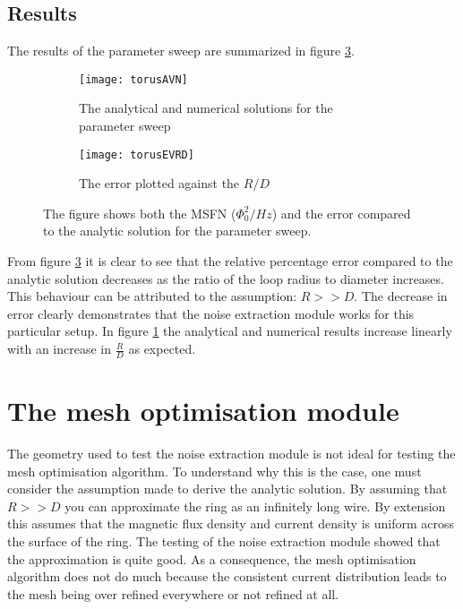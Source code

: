 \subsection{Results}

The results of the parameter sweep are summarized in figure \ref{fig:resTorus}.
\begin{figure}[H]
    \centering
    \begin{subfigure}[b]{0.48\textwidth}
        \centering
        \texttt{[image: torusAVN]}
        \caption{The analytical and numerical solutions for the parameter sweep}
        \label{fig:MSFNvRD}
    \end{subfigure}
    \hfill
    \begin{subfigure}[b]{0.48\textwidth}
        \centering
        \texttt{[image: torusEVRD]}
        \caption{The error plotted against the $R/D$}
        \label{fig:evRD}
    \end{subfigure}
    \caption{The figure shows both the MSFN ($\Phi_0^2 / Hz$) and the error compared to the analytic solution for the parameter sweep.}
    \label{fig:resTorus}
\end{figure}
From figure \ref{fig:resTorus} it is clear to see that the relative percentage error compared to the analytic solution decreases as the ratio of the loop radius to diameter increases. This behaviour can be attributed to the assumption: $R >> D$. The decrease in error clearly demonstrates that the noise extraction module works for this particular setup. In figure \ref{fig:MSFNvRD} the analytical and numerical results increase linearly with an increase in $\frac{R}{D}$ as expected.

\section{The mesh optimisation module}
The geometry used to test the noise extraction module is not ideal for testing the mesh optimisation algorithm. To understand why this is the case, one must consider the assumption made to derive the analytic solution. By assuming that $R >> D$ you can approximate the ring as an infinitely long wire. By extension this assumes that the magnetic flux density and current density is uniform across the surface of the ring. The testing of the noise extraction module showed that the approximation is quite good. As a consequence, the mesh optimisation algorithm does not do much because the consistent current distribution leads to the mesh being over refined everywhere or not refined at all.
